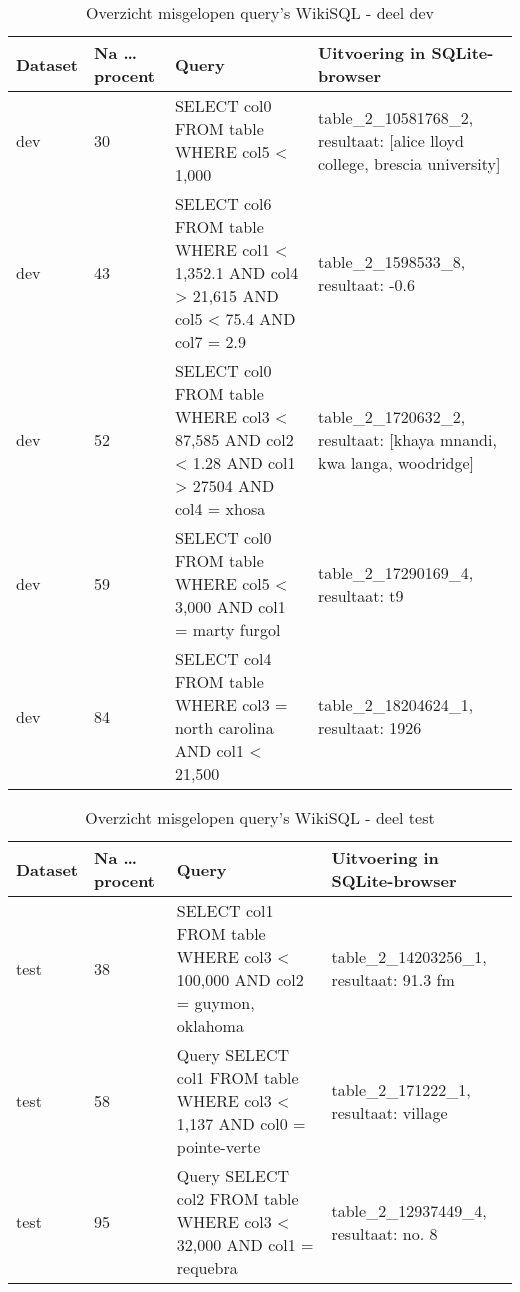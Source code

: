 \begin{table}[]
	\centering
	\begin{tabular}{ | l | l | p{5cm} | p{5cm} |}
		\hline
		Dataset & Na \dots procent & Query & Uitvoering in SQLite-browser \\ \hline
		dev 	& 30 			   & SELECT col0 FROM table WHERE col5 < 1,000 & table\_2\_10581768\_2, resultaat: [alice lloyd college, brescia university]  \\ \hline
		dev 	& 43 			   & SELECT col6 FROM table WHERE col1 < 1,352.1 AND col4 > 21,615 AND col5 < 75.4 AND col7 = 2.9  & table\_2\_1598533\_8, resultaat: -0.6  \\ \hline
		dev 	& 52 			   & SELECT col0 FROM table WHERE col3 < 87,585 AND col2 < 1.28 AND col1 > 27504 AND col4 = xhosa & table\_2\_1720632\_2, resultaat: [khaya mnandi, kwa langa, woodridge]  \\ \hline
		dev 	& 59 			   & SELECT col0 FROM table WHERE col5 < 3,000 AND col1 = marty furgol & table\_2\_17290169\_4, resultaat: t9  \\ \hline
		dev 	& 84 			   & SELECT col4 FROM table WHERE col3 = north carolina AND col1 < 21,500 & table\_2\_18204624\_1, resultaat: 1926  \\ \hline
	\end{tabular}
	\caption{Overzicht misgelopen query's WikiSQL - deel dev}
	\label{table:wikisqlerrorsdev}
\end{table}

\begin{table}[]
	\centering
	\begin{tabular}{ | l | l | p{5cm} | p{5cm} |}
		\hline
		Dataset & Na \dots procent & Query & Uitvoering in SQLite-browser \\ \hline
		test 	& 38 			   & SELECT col1 FROM table WHERE col3 < 100,000 AND col2 = guymon, oklahoma & table\_2\_14203256\_1, resultaat: 91.3 fm  \\ \hline
		test 	& 58 			   & Query SELECT col1 FROM table WHERE col3 < 1,137 AND col0 = pointe-verte & table\_2\_171222\_1, resultaat: village  \\ \hline
		test 	& 95 			   & Query SELECT col2 FROM table WHERE col3 < 32,000 AND col1 = requebra & table\_2\_12937449\_4, resultaat: no. 8  \\ \hline
	\end{tabular}
	\caption{Overzicht misgelopen query's WikiSQL - deel test}
	\label{table:wikisqlerrorstest}
\end{table}